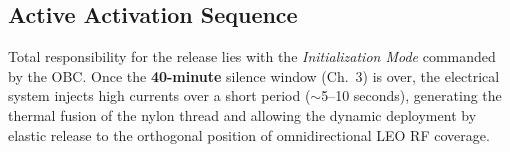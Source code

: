 \subsection{Active Activation Sequence}
Total responsibility for the release lies with the \textit{Initialization Mode} commanded by the OBC. Once the \textbf{40-minute} silence window (Ch.~3) is over, the electrical system injects high currents over a short period ($\sim$5--10 seconds), generating the thermal fusion of the nylon thread and allowing the dynamic deployment by elastic release to the orthogonal position of omnidirectional LEO RF coverage.
